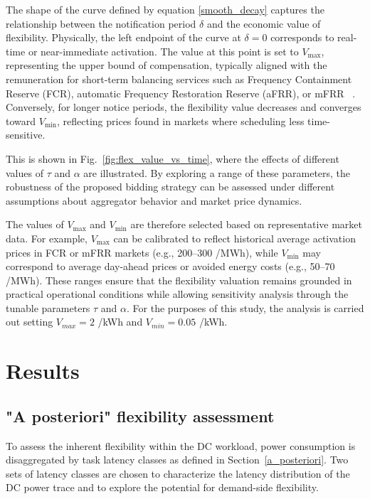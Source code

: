 \documentclass[preprint,12pt]{elsarticle}
\begin{document}
The shape of the curve defined by equation \ref{smooth_decay} captures the relationship between the notification period \( \delta \) and the economic value of flexibility. Physically, the left endpoint of the curve at \( \delta = 0 \) corresponds to real-time or near-immediate activation. The value at this point is set to \( V_{\max} \), representing the upper bound of compensation, typically aligned with the remuneration for short-term balancing services such as Frequency Containment Reserve (FCR), automatic Frequency Restoration Reserve (aFRR), or mFRR ~\cite{entsoe_balancing}. Conversely, for longer notice periods, the flexibility value decreases and converges toward \( V_{\min} \), reflecting prices found in markets where scheduling less time-sensitive.

This is shown in Fig.~\ref{fig:flex_value_vs_time}, where the effects of different values of \( \tau \) and \( \alpha \) are illustrated. By exploring a range of these parameters, the robustness of the proposed bidding strategy can be assessed under different assumptions about aggregator behavior and market price dynamics.

The values of \( V_{\max} \) and \( V_{\min} \) are therefore selected based on representative market data. For example, \( V_{\max} \) can be calibrated to reflect historical average activation prices in FCR or mFRR markets (e.g., 200–300 \texteuro/MWh), while \( V_{\min} \) may correspond to average day-ahead prices or avoided energy costs (e.g., 50–70 \texteuro/MWh). These ranges ensure that the flexibility valuation remains grounded in practical operational conditions while allowing sensitivity analysis through the tunable parameters \( \tau \) and \( \alpha \). For the purposes of this study, the analysis is carried out setting $V_{max} = 2$ \texteuro/kWh and $V_{min} = 0.05$ \texteuro/kWh.



\section{Results}\label{results}


\subsection{"A posteriori" flexibility assessment} \label{a_posteriori_results}

To assess the inherent flexibility within the DC workload, power consumption is disaggregated by task latency classes as defined in Section~\ref{a_posteriori}. Two sets of latency classes are chosen to characterize the latency distribution of the DC power trace and to explore the potential for demand-side flexibility.
\end{document}
